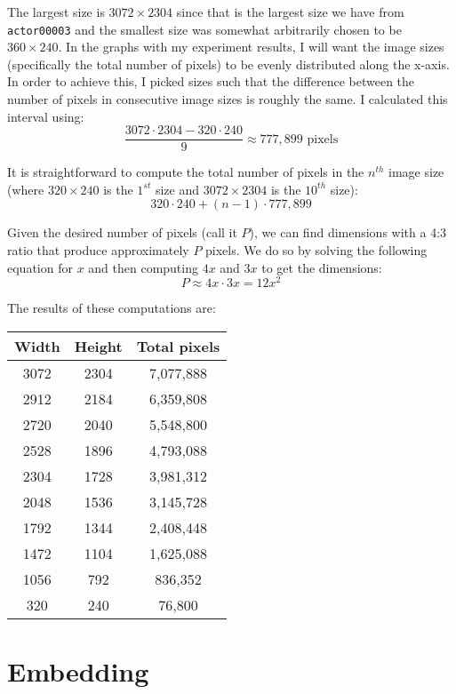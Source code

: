 \documentclass[11pt,a4paper,twoside,openright]{report}
\begin{document}
The largest size is $3072\times2304$ since that is the largest size we have from \texttt{actor00003} and the smallest size was somewhat arbitrarily chosen to be $360\times240$. In the graphs with my experiment results, I will want the image sizes (specifically the total number of pixels) to be evenly distributed along the x-axis. In order to achieve this, I picked sizes such that the difference between the number of pixels in consecutive image sizes is roughly the same. I calculated this interval using:
\begin{equation*}
\frac{3072 \cdot 2304 - 320 \cdot 240}{9} \approx 777,899 \text{ pixels}
\end{equation*}

It is straightforward to compute the total number of pixels in the $n^{th}$ image size (where $320 \times 240$ is the $1^{st}$ size and $3072 \times 2304$ is the $10^{th}$ size):
\begin{equation*}
320 \cdot 240 + (n-1) \cdot 777,899
\end{equation*}

Given the desired number of pixels (call it $P$), we can find dimensions with a 4:3 ratio that produce approximately $P$ pixels. We do so by solving the following equation for $x$ and then computing $4x$ and $3x$ to get the dimensions:
\begin{equation*}
 P \approx 4x \cdot 3x = 12x^2
 \end{equation*}

The results of these computations are:
\begin{center}
\begin{tabular}{ c  c | c}
Width & Height & Total pixels \\ \hline
3072 & 2304 & 7,077,888 \\
2912 & 2184 & 6,359,808 \\
2720 & 2040 & 5,548,800 \\
2528 & 1896 & 4,793,088 \\
2304 & 1728 & 3,981,312 \\
2048 & 1536 & 3,145,728 \\
1792 & 1344 & 2,408,448 \\
1472 & 1104 & 1,625,088 \\
1056 & 792 & 836,352 \\
320 & 240 & 76,800 \\
\end{tabular}
\end{center}


\section{Embedding}
\end{document}
